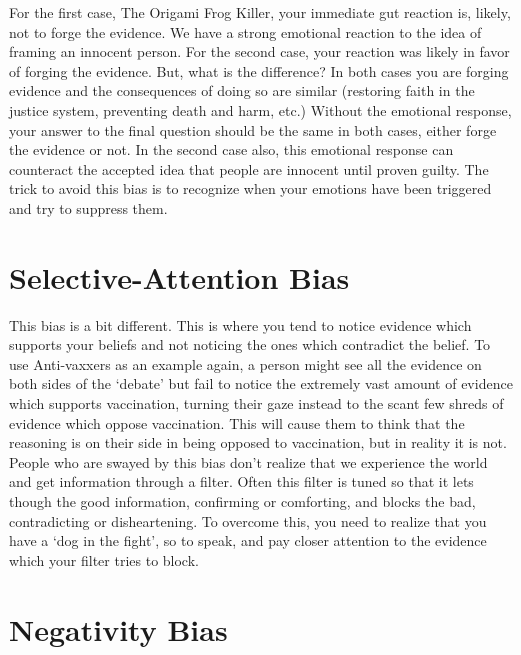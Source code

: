 For the first case, The Origami Frog Killer, your immediate gut reaction is, likely, not to forge the evidence. We have a strong emotional reaction to the idea of framing an innocent person. For the second case, your reaction was likely in favor of forging the evidence. But, what is the difference? In both cases you are forging evidence and the consequences of doing so are similar (restoring faith in the justice system, preventing death and harm, etc.) Without the emotional response, your answer to the final question should be the same in both cases, either forge the evidence or not. In the second case also, this emotional response can counteract the accepted idea that people are innocent until proven guilty. The trick to avoid this bias is to recognize when your emotions have been triggered and try to suppress them.

\section{Selective-Attention Bias}

This bias is a bit different. This is where you tend to notice evidence which supports your beliefs and not noticing the ones which contradict the belief. To use Anti-vaxxers as an example again, a person might see all the evidence on both sides of the `debate' but fail to notice the extremely vast amount of evidence which supports vaccination, turning their gaze instead to the scant few shreds of evidence which oppose vaccination. This will cause them to think that the reasoning is on their side in being opposed to vaccination, but in reality it is not. People who are swayed by this bias don't realize that we experience the world and get information through a filter. Often this filter is tuned so that it lets though the good information, confirming or comforting, and blocks the bad, contradicting or disheartening. To overcome this, you need to realize that you have a `dog in the fight', so to speak, and pay closer attention to the evidence which your filter tries to block.

\section{Negativity Bias}

